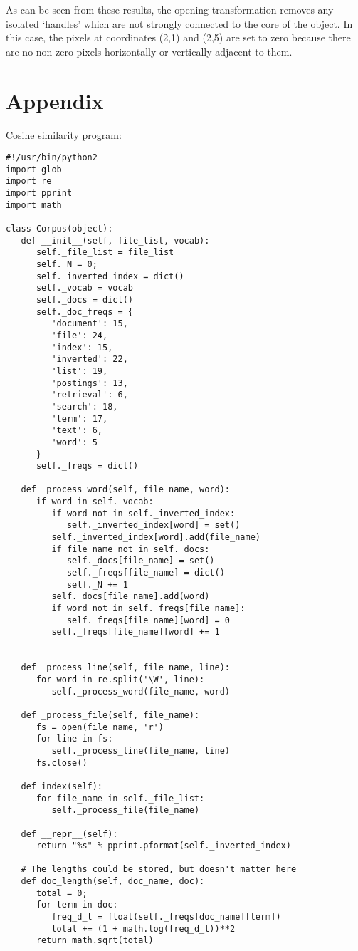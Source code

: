 \documentclass[11pt]{article}
\begin{document}
As can be seen from these results, the opening transformation removes any
isolated `handles' which are not strongly connected to the core of the object.
In this case, the pixels at coordinates (2,1) and (2,5) are set to zero because
there are no non-zero pixels horizontally or vertically adjacent to them.

\section*{Appendix}

Cosine similarity program:
\footnotesize
\begin{verbatim}
#!/usr/bin/python2
import glob
import re
import pprint
import math

class Corpus(object):
   def __init__(self, file_list, vocab):
      self._file_list = file_list
      self._N = 0;
      self._inverted_index = dict()
      self._vocab = vocab
      self._docs = dict()
      self._doc_freqs = {
         'document': 15,
         'file': 24,
         'index': 15,
         'inverted': 22,
         'list': 19,
         'postings': 13,
         'retrieval': 6,
         'search': 18,
         'term': 17,
         'text': 6,
         'word': 5
      }
      self._freqs = dict()
   
   def _process_word(self, file_name, word):
      if word in self._vocab:
         if word not in self._inverted_index:
            self._inverted_index[word] = set()
         self._inverted_index[word].add(file_name)
         if file_name not in self._docs:
            self._docs[file_name] = set()
            self._freqs[file_name] = dict()
            self._N += 1
         self._docs[file_name].add(word)
         if word not in self._freqs[file_name]:
            self._freqs[file_name][word] = 0
         self._freqs[file_name][word] += 1


   def _process_line(self, file_name, line):
      for word in re.split('\W', line):
         self._process_word(file_name, word)

   def _process_file(self, file_name):
      fs = open(file_name, 'r')
      for line in fs:
         self._process_line(file_name, line)
      fs.close()

   def index(self):
      for file_name in self._file_list:
         self._process_file(file_name)

   def __repr__(self):
      return "%s" % pprint.pformat(self._inverted_index)

   # The lengths could be stored, but doesn't matter here
   def doc_length(self, doc_name, doc):
      total = 0;
      for term in doc:
         freq_d_t = float(self._freqs[doc_name][term])
         total += (1 + math.log(freq_d_t))**2
      return math.sqrt(total)


\end{verbatim}
\end{document}
